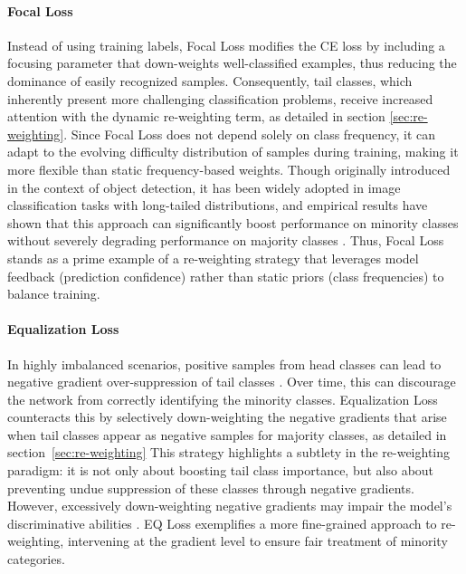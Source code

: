 \paragraph{Focal Loss}
Instead of using training labels, Focal Loss \cite{lin2018focallossdenseobject} modifies the CE loss by including a focusing parameter that down-weights well-classified examples, thus reducing the dominance of easily recognized samples. Consequently, tail classes, which inherently present more challenging classification problems, receive increased attention with the dynamic re-weighting term, as detailed in section \ref{sec:re-weighting}. Since Focal Loss does not depend solely on class frequency, it can adapt to the evolving difficulty distribution of samples during training, making it more flexible than static frequency-based weights. Though originally introduced in the context of object detection, it has been widely adopted in image classification tasks with long-tailed distributions, and empirical results have shown that this approach can significantly boost performance on minority classes without severely degrading performance on majority classes \cite{lin2018focallossdenseobject,zhang2023deep}. Thus, Focal Loss stands as a prime example of a re-weighting strategy that leverages model feedback (prediction confidence) rather than static priors (class frequencies) to balance training.

\paragraph{Equalization Loss}
In highly imbalanced scenarios, positive samples from head classes can lead to negative gradient over-suppression of tail classes \cite{zhang2023deep}. Over time, this can discourage the network from correctly identifying the minority classes. Equalization Loss \cite{tan2020equalizationlosslongtailedobject} counteracts this by selectively down-weighting the negative gradients that arise when tail classes appear as negative samples for majority classes, as detailed in section~\ref{sec:re-weighting} This strategy highlights a subtlety in the re-weighting paradigm: it is not only about boosting tail class importance, but also about preventing undue suppression of these classes through negative gradients. However, excessively down-weighting negative gradients may impair the model's discriminative abilities \cite{zhang2023deep}. EQ Loss exemplifies a more fine-grained approach to re-weighting, intervening at the gradient level to ensure fair treatment of minority categories. 


